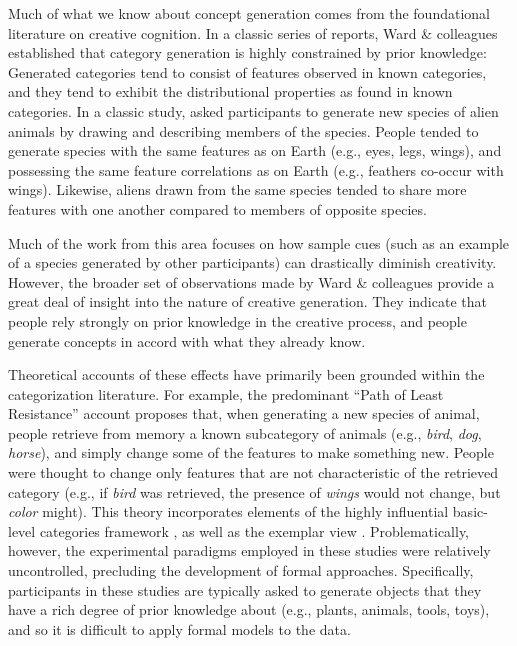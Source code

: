\documentclass[12pt]{article}
\begin{document}
\begin{flushleft}
Much of what we know about concept generation comes from the foundational literature on creative cognition. In a classic series of reports, Ward \& colleagues \citep{ward1995s,ward1994structured,marsh1999inadvertent,ward2002role,smith1993constraining} established that category generation is highly constrained by prior knowledge: Generated categories tend to consist of features observed in known categories, and they tend to exhibit the distributional properties as found in known categories. In a classic study, \cite{ward1994structured} asked participants to generate new species of alien animals by drawing and describing members of the species. People tended to generate species with the same features as on Earth (e.g., eyes, legs, wings), and possessing the same feature correlations as on Earth (e.g., feathers co-occur with wings). Likewise, aliens drawn from the same species tended to share more features with one another compared to members of opposite species. 

Much of the work from this area \citep[e.g.,][]{smith1993constraining,marsh1999inadvertent} focuses on how sample cues (such as an example of a species generated by other participants) can drastically diminish creativity. However, the broader set of observations made by Ward \& colleagues provide a great deal of insight into the nature of creative generation. They indicate that people rely strongly on prior knowledge in the creative process, and people generate concepts in accord with what they already know. 

Theoretical accounts of these effects have primarily been grounded within the categorization literature. For example, the predominant ``Path of Least Resistance'' account \citep[see][]{ward1994structured,ward1995s,ward2002role} proposes that, when generating a new species of animal, people retrieve from memory a known subcategory of animals (e.g., \textit{bird}, \textit{dog}, \textit{horse}), and simply change some of the features to make something new. People were thought to change only features that are not characteristic of the retrieved category (e.g., if \textit{bird} was retrieved, the presence of \textit{wings} would not change, but \textit{color} might). This theory incorporates elements of the highly influential basic-level categories framework \citep{rosch1975cognitive,rosch1976basic}, as well as the exemplar view \citep{medin1978context,nosofsky1984choice,nosofsky1986attention}. Problematically, however, the experimental paradigms employed in these studies were relatively uncontrolled, precluding the development of formal approaches. Specifically, participants in these studies are typically asked to generate objects that they have a rich degree of prior knowledge about (e.g., plants, animals, tools, toys), and so it is difficult to apply formal models to the data.


\end{flushleft}
\end{document}
